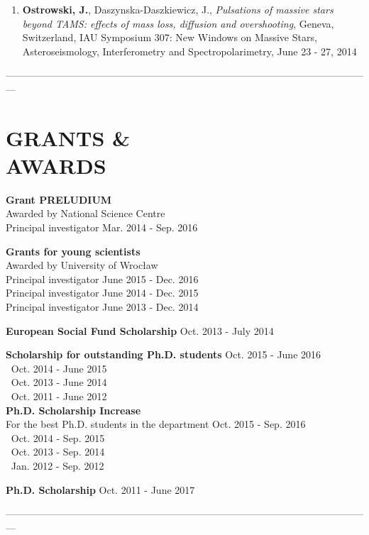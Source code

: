 \documentclass[margin, 10pt]{res} %
\begin{document}
\begin{resume}
\begin{enumerate}
    \item \textbf{Ostrowski, J.}, Daszynska-Daszkiewicz, J., \textit{Pulsations of massive stars beyond TAMS: effects of mass loss, diffusion and overshooting}, Geneva, Switzerland, IAU Symposium 307: New Windows on Massive Stars, Asteroseismology, Interferometry and Spectropolarimetry, June 23 - 27, 2014
\end{enumerate}

---------------------------------------------------------------------------------------------------------------

\section{GRANTS \& \\ AWARDS} 

{\bf Grant PRELUDIUM} \\
Awarded by National Science Centre \\
Principal investigator \hfill Mar. 2014 - Sep. 2016

{\bf Grants for young scientists} \\
Awarded by University of Wroc\l{}aw \\
Principal investigator \hfill June 2015 - Dec. 2016 \\
Principal investigator \hfill June 2014 - Dec. 2015 \\
Principal investigator \hfill June 2013 - Dec. 2014

{\bf European Social Fund Scholarship} \hfill Oct. 2013 - July 2014

{\bf Scholarship for outstanding Ph.D. students} \hfill Oct. 2015 - June 2016 \\
$~$ \hfill Oct. 2014 - June 2015 \\
$~$ \hfill Oct. 2013 - June 2014 \\
$~$ \hfill Oct. 2011 - June 2012 \\

{\bf Ph.D. Scholarship Increase} \\
For the best Ph.D. students in the department \hfill Oct. 2015 - Sep. 2016 \\
$~$ \hfill Oct. 2014 - Sep. 2015 \\
$~$ \hfill Oct. 2013 - Sep. 2014 \\
$~$ \hfill Jan. 2012 - Sep. 2012

{\bf Ph.D. Scholarship}  \hfill Oct. 2011 - June 2017

---------------------------------------------------------------------------------------------------------------


\end{resume}
\end{document}

